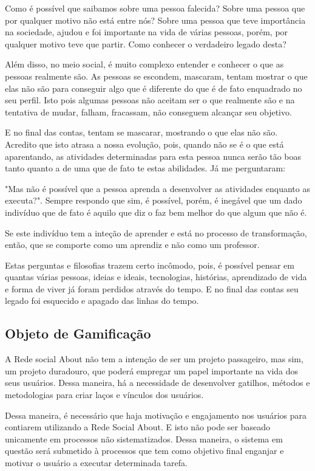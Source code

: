 Como é possível que saibamos sobre uma pessoa falecida? Sobre uma pessoa que por qualquer motivo não está entre nós? Sobre uma pessoa que teve importância na sociedade, ajudou e foi importante na vida de várias pessoas, porém, por qualquer motivo teve que partir. Como conhecer o verdadeiro legado desta?

Além disso, no meio social, é muito complexo entender e conhecer o que as 
pessoas
realmente são. As pessoas se escondem, mascaram, tentam mostrar o que elas não
são para conseguir algo que é diferente do que é de fato enquadrado no seu
perfil. Isto pois algumas pessoas não aceitam ser o que realmente são e na
tentativa de mudar, falham, fracassam, não conseguem alcançar seu objetivo.

E no final das contas, tentam se mascarar, mostrando o que elas não são.
Acredito que isto atrasa a nossa evolução, pois, quando não se é o que está
aparentando, as atividades determinadas para esta pessoa nunca serão tão
boas tanto quanto a de uma que de fato te estas abilidades. Já me perguntaram: 

"Mas não é possível que a pessoa aprenda a desenvolver as atividades enquanto
as executa?". Sempre respondo que sim, é possível, porém, é inegável que um
dado indivíduo que de fato é aquilo que diz o faz bem melhor do que algum
que não é.

Se este indivíduo tem a inteção de aprender e está no processo de transformação,
então, que se comporte como um aprendiz e não como um professor.

Estas perguntas e filosofias trazem certo incômodo, pois, é possível pensar em 
quantas várias
pessoas, ideias e ideais, tecnologias, histórias, aprendizado de vida e forma de
viver já foram perdidos através do tempo. E no final das contas seu legado
foi esquecido e apagado das linhas do tempo.


\subsection{Objeto de Gamificação}
A Rede social About não tem a intenção de ser um projeto passageiro, mas sim,
um projeto duradouro, que poderá empregar um papel importante na vida dos
seus usuários. Dessa maneira, há a necessidade de desenvolver gatilhos, métodos
e metodologias para criar laços e vínculos dos usuários.

Dessa maneira, é necessário que haja motivação e engajamento nos usuários para contiarem utilizando a Rede Social About. E isto não pode ser baseado unicamente
em processos não sistematizados. Dessa maneira, o sistema em questão será
submetido à processos que tem como objetivo final enganjar e motivar o usuário
a executar determinada tarefa.

